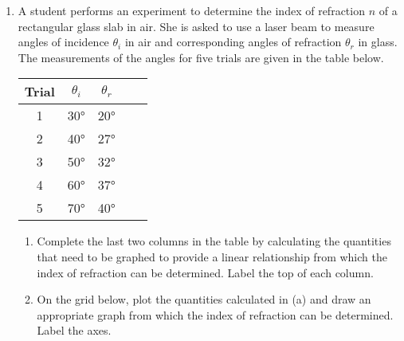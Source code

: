 \documentclass{../../../oss-classkick}
\begin{document}
\begin{enumerate}[leftmargin=15pt]
\item A student performs an experiment to determine the index of refraction $n$
  of a rectangular glass slab in air. She is asked to use a laser beam to
  measure angles of incidence $\theta_i$ in air and corresponding angles of
  refraction $\theta_r$ in glass. The measurements of the angles for five
  trials are given in the table below.
  \begin{center}
    \bgroup
    \def\arraystretch{1.7}
    \begin{tabular}{|c|c|c|p{1in}|p{1in}|}
      \hline
      Trial & $\theta_i$ & $\theta_r$ & & \\ \hline
      \hspace{.2in}1\hspace{.2in} & \hspace{.2in}\ang{30}\hspace{.2in} &
      \hspace{.2in}\ang{20}\hspace{.2in} & & \\ \hline
      2 & \ang{40} & \ang{27} & & \\ \hline
      3 & \ang{50} & \ang{32} & & \\ \hline
      4 & \ang{60} & \ang{37} & & \\ \hline
      5 & \ang{70} & \ang{40} & & \\ \hline
    \end{tabular}
    \egroup
  \end{center}
  \begin{enumerate}
  \item Complete the last two columns in the table by calculating the
    quantities that need to be graphed to provide a linear relationship from
    which the index of refraction can be determined. Label the top of each
    column.
  \item On the grid below, plot the quantities calculated in (a) and draw an
    appropriate graph from which the index of refraction can be determined.
    Label the axes.
    

\end{enumerate}
\end{enumerate}
\end{document}
